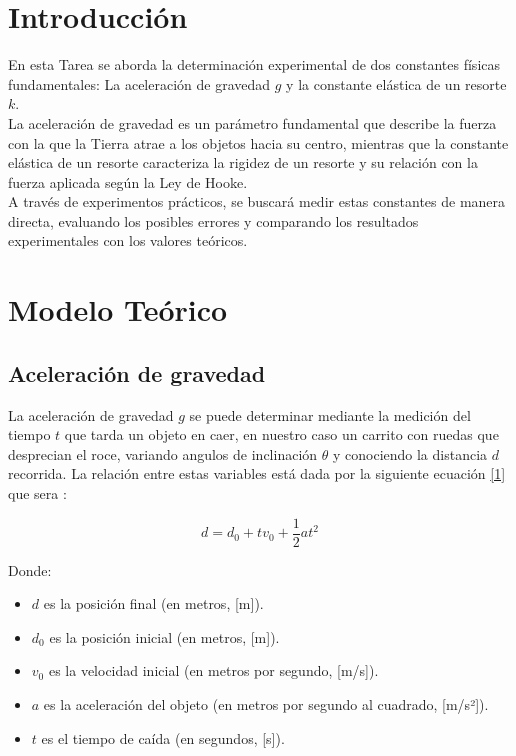 \documentclass{article}
\begin{document}
\begin{multicols}{2}

\section*{Introducción}

En esta Tarea se aborda la determinación experimental de
dos constantes físicas fundamentales: La aceleración de gravedad $g$
y la constante elástica de un resorte $k$.\\
La aceleración de gravedad es un parámetro fundamental que describe la
fuerza con la que la Tierra atrae a los objetos hacia su centro, mientras
que la constante elástica de un resorte caracteriza la rigidez de un resorte
y su relación  con la fuerza aplicada según la Ley de Hooke.\\
A través de experimentos prácticos, se buscará medir estas constantes de
manera directa, evaluando los posibles errores y comparando los resultados
experimentales con los valores teóricos.

\section*{Modelo Teórico}

    \subsection*{Aceleración de gravedad}

        La aceleración de gravedad $g$ se puede determinar mediante la medición del tiempo $t$ que tarda 
        un objeto en caer, en nuestro caso un carrito con ruedas que desprecian el roce, variando angulos
        de inclinación $\theta$ y conociendo la distancia $d$ recorrida. La relación entre estas variables
        está dada por la siguiente ecuación \ref{1} que sera  :

            \begin{equation}
                d = d_0 + tv_0 + \frac{1}{2} a t^2
            \end{equation}

        Donde:

            \begin{itemize}
                \item $d$ es la posición final (en metros, [m]).
                \item $d_0$ es la posición inicial (en metros, [m]).
                \item $v_0$ es la velocidad inicial (en metros por segundo, [m/s]).
                \item $a$ es la aceleración del objeto (en metros por segundo al cuadrado, [m/s²]).
                \item $t$ es el tiempo de caída (en segundos, [s]).
            \end{itemize}


\end{multicols}
\end{document}
